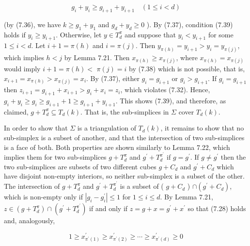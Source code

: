 \documentclass[12pt]{article}
\begin{document}
\begin{equation*}
g_{i}+y_{i} \geq g_{i+1}+y_{i+1} \quad(1 \leq i<d) \tag{7.39}
\end{equation*}


(by (7.36), we have $k \geq g_{1}+y_{1}$ and $g_{d}+y_{d} \geq 0$ ). By (7.37), condition (7.39) holds if $y_{i} \geq y_{i+1}$. Otherwise, let $y \in T_{d}^{\pi}$ and suppose that $y_{i}<y_{i+1}$ for some $1 \leq i<d$. Let $i+1=\pi(h)$ and $i=\pi(j)$. Then $y_{\pi(h)}=y_{i+1}>y_{i}=y_{\pi(j)}$, which implies $h<j$ by Lemma 7.21. Then $x_{\pi(h)} \geq x_{\pi(j)}$, where $x_{\pi(h)}=x_{\pi(j)}$ would imply $i+1=\pi(h)<$ $\pi(j)=i$ by (7.38) which is not possible, that is, $x_{i+1}=x_{\pi(h)}>x_{\pi(j)}=x_{i}$. By (7.37), either $g_{i}=g_{i+1}$ or $g_{i}>g_{i+1}$. If $g_{i}=g_{i+1}$ then $z_{i+1}=g_{i+1}+x_{i+1}>g_{i}+x_{i}=z_{i}$, which violates (7.32). Hence, $g_{i}+y_{i} \geq g_{i} \geq g_{i+1}+1 \geq g_{i+1}+y_{i+1}$. This shows (7.39), and therefore, as claimed, $g+T_{d}^{\pi} \subseteq T_{d}(k)$. That is, the sub-simplices in $\Sigma$ cover $T_{d}(k)$.

In order to show that $\Sigma$ is a triangulation of $T_{d}(k)$, it remains to show that no sub-simplex is a subset of another, and that the intersection of two sub-simplices is a face of both. Both properties are shown similarly to Lemma 7.22, which implies them for two sub-simplices $g+T_{d}^{\pi}$ and $g^{\prime}+T_{d}^{\pi^{\prime}}$ if $g=g^{\prime}$. If $g \neq g^{\prime}$ then the two sub-simplices are subsets of two different cubes $g+C_{d}$ and $g^{\prime}+C_{d}$ which have disjoint non-empty interiors, so neither sub-simplex is a subset of the other. The intersection of $g+T_{d}^{\pi}$ and $g^{\prime}+T_{d}^{\pi^{\prime}}$ is a subset of ( $g+C_{d}$ ) $\cap\left(g^{\prime}+C_{d}\right)$, which is non-empty only if $\left|g_{i}-g_{i}^{\prime}\right| \leq 1$ for $1 \leq i \leq d$. By Lemma 7.21, $z \in\left(g+T_{d}^{\pi}\right) \cap\left(g^{\prime}+T_{d}^{\pi^{\prime}}\right)$ if and only if $z=g+x=g^{\prime}+x^{\prime}$ so that (7.28) holds and, analogously,


\begin{equation*}
1 \geq x_{\pi^{\prime}(1)}^{\prime} \geq x_{\pi^{\prime}(2)}^{\prime} \geq \cdots \geq x_{\pi^{\prime}(d)}^{\prime} \geq 0 \tag{7.40}
\end{equation*}
\end{document}
